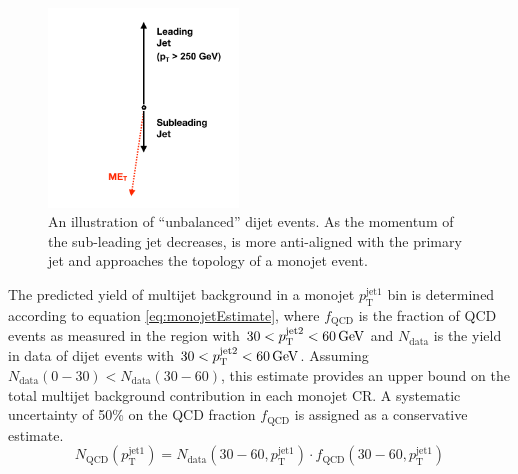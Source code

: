 \begin{figure}
	\centering
	\includegraphics[width=0.45\textwidth]{backgrounds/figs/dijet_cartoon_Moriond2017}
	\renewcommand{\baselinestretch}{1.0}
	\caption[An illustration of ``unbalanced'' dijet events.]{An illustration of ``unbalanced'' dijet events. As the momentum of the sub-leading jet decreases, \MET is more anti-aligned with the primary jet and approaches the topology of a monojet event.}
	\label{fig:monojetCartoon}
\end{figure}

The predicted yield of multijet background in a monojet $p_{\mathrm{T}}^{\mathrm{jet1}}$ bin is determined according to equation \ref{eq:monojetEstimate}, where $f_{\mathrm{QCD}}$ is the fraction of QCD events as measured in the region with $30 < p_{\mathrm{T}}^{\mathrm{jet2}} < 60 \,\text{Ge\hspace{-.08em}V}$ and $N_{\mathrm{data}}$ is the yield in data of dijet events with $30 < p_{\mathrm{T}}^{\mathrm{jet2}} < 60 \,\text{Ge\hspace{-.08em}V}$. Assuming $N_{\mathrm{data}}(0-30) < N_{\mathrm{data}}(30-60)$, this estimate provides an upper bound on the total multijet background contribution in each monojet CR. A systematic uncertainty of 50\% on the QCD fraction $f_{\mathrm{QCD}}$ is assigned as a conservative estimate.
\begin{equation}
	N_{\mathrm{QCD}}(p_{\mathrm{T}}^{\mathrm{jet1}}) = N_{\mathrm{data}}(30-60,p_{\mathrm{T}}^{\mathrm{jet1}}) \cdot f_{\mathrm{QCD}}(30-60,p_{\mathrm{T}}^{\mathrm{jet1}})
	\label{eq:monojetEstimate}
\end{equation}

